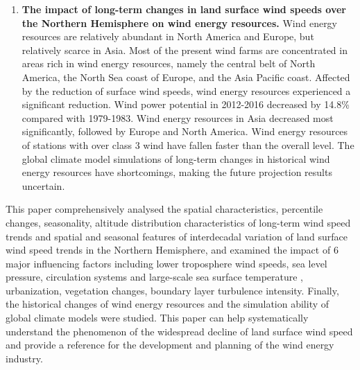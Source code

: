 \begin{enumerate}
\item  \textbf{The impact of long-term changes in land surface wind speeds over the Northern Hemisphere on wind energy resources.} Wind energy resources are relatively abundant in North America and Europe, but relatively scarce in Asia. Most of the present wind farms are concentrated in areas rich in wind energy resources, namely the central belt of North America, the North Sea coast of Europe, and the Asia Pacific coast. Affected by the reduction of surface wind speeds, wind energy resources experienced a significant reduction. Wind power potential in 2012-2016 decreased by 14.8\% compared with 1979-1983. Wind energy resources in Asia decreased most significantly, followed by Europe and North America. Wind energy resources of stations with over class 3 wind have fallen faster than the overall level. The global climate model simulations of long-term changes in historical wind energy resources have shortcomings, making the future projection results uncertain.

\end{enumerate}

This paper comprehensively analysed the spatial characteristics, percentile changes, seasonality, altitude distribution characteristics of long-term wind speed trends and spatial and seasonal features of interdecadal variation of land surface wind speed trends in the Northern Hemisphere, and examined the impact of 6 major influencing factors including lower troposphere wind speeds, sea level pressure, circulation systems and large-scale sea surface temperature , urbanization, vegetation changes, boundary layer turbulence intensity. Finally, the historical changes of wind energy resources and the simulation ability of global climate models were studied. This paper can help systematically understand the phenomenon of the widespread decline of land surface wind speed and provide a reference for the development and planning of the wind energy industry.

